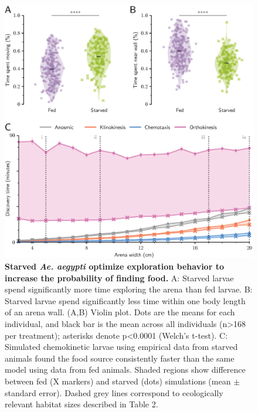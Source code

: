 \begin{figure}[t!]
\includegraphics[width=\textwidth]{Figures/images/6.eps}
 \caption{\textbf{ Starved \textit{Ae. aegypti} optimize exploration behavior to increase the probability of finding food.} A: Starved larvae spend significantly more time exploring the arena than fed larvae. B: Starved larvae spend significantly less time within one body length of an arena wall. (A,B) Violin plot. Dots are the means for each individual, and black bar is the mean across all individuals (n>168 per treatment); asterisks denote p<0.0001 (Welch's t-test).  C: Simulated chemokinetic larvae using empirical data from starved animals found the food source consistently faster than the same model using data from fed animals. Shaded regions show difference between fed (X markers) and starved (dots) simulations (mean ${\pm}$ standard error). Dashed grey lines correspond to ecologically relevant habitat sizes described in Table 2. 
}
\end{figure}